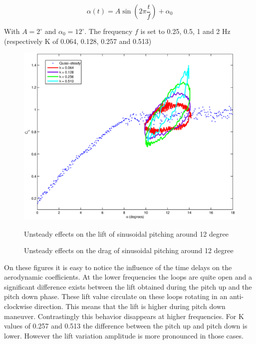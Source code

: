 \begin{equation}
	\alpha\left( t \right)= A \sin \left( 2 \pi \frac{t}{f} \right) + \alpha_0
	\label{eqn:pitch_input}
\end{equation}

With $A=2^\circ$ and $\alpha_0=12^\circ$.
The frequency $f$ is set to 0.25, 0.5, 1 and 2 Hz (respectively K of 0.064, 0.128, 0.257 and 0.513)

\begin{figure}[h]
	\begin{center}
		\scalebox{0.6}  
		{\includegraphics{./Figures/Pitching_allcases_CL_12_amp_2.eps}}
	\end{center}
	\caption{Unsteady effects on the lift of sinusoidal pitching around 12 degree} 
	\label{fig:Pitching_allcases_Cl_12}
\end{figure}

\begin{figure}[h]
  \begin{center}
  \end{center}
  \caption{Unsteady effects on the drag of sinusoidal pitching around 12 degree} 
  \label{fig:Pitching_allcases_Cd_12}
\end{figure}

\FloatBarrier

\par On these figures it is easy to notice the influence of the time delays on the aerodynamic coefficients.
At the lower frequencies the loops are quite open and a significant difference exists between the lift obtained during the pitch up and the pitch down phase.
These lift value circulate on these loops rotating in an anti-clockwise direction.
This means that the lift is higher during pitch down maneuver.
Contrastingly this behavior disappears at higher frequencies.
For K values of 0.257 and 0.513 the difference between the pitch up and pitch down is lower.
However the lift variation amplitude is more pronounced in those cases.


